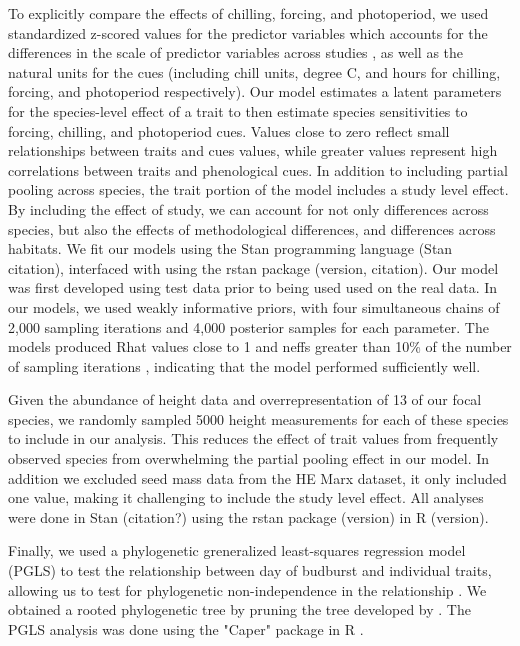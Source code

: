 \documentclass{article}\usepackage[]{graphicx}\usepackage[]{color}
\begin{document}
To explicitly compare the effects of chilling, forcing, and photoperiod, we used standardized z-scored values for the predictor variables which accounts for the differences in the scale of predictor variables across studies \citep{Gelman2006}, as well as the natural units for the cues (including chill units, degree C, and hours for chilling, forcing, and photoperiod respectively). Our model estimates a latent parameters for the species-level effect of a trait to then estimate species sensitivities to forcing, chilling, and photoperiod cues. Values close to zero reflect small relationships between traits and cues values, while greater values represent high correlations between traits and phenological cues. In addition to including partial pooling across species, the trait portion of the model includes a study level effect. By including the effect of study, we can account for not only differences across species, but also the effects of methodological differences, and differences across habitats. We fit our models using the Stan programming language (Stan citation), interfaced with using the rstan package (version, citation). Our model was first developed using test data prior to being used used on the real data. In our models, we used weakly informative priors, with four simultaneous chains of 2,000 sampling iterations and 4,000 posterior samples for each parameter. The models produced Rhat values close to 1 and neffs greater than 10\% of the number of sampling iterations %
, indicating that the model performed sufficiently well.  

Given the abundance of height data and overrepresentation of 13 of our focal species, we randomly sampled 5000 height measurements for each of these species to include in our analysis. This reduces the effect of trait values from frequently observed species from overwhelming the partial pooling effect in our model. In addition we excluded seed mass data from the HE Marx dataset, it only included one value, making it challenging to include the study level effect.
 All analyses were done in Stan (citation?) using the rstan package (version) in R (version). 

Finally, we used a phylogenetic greneralized least-squares regression model (PGLS) to test the relationship between day of budburst and individual traits, allowing us to test for phylogenetic non-independence in the relationship \citep{Freckleton2002}. We obtained a rooted phylogenetic tree by pruning the tree developed by \citep{Smith2018}. The PGLS analysis was done using the "Caper" package in R \citep{Orne2013}.
\end{document}
